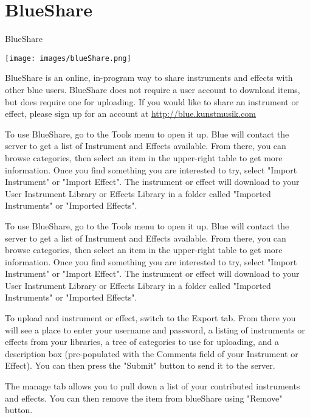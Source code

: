 \section{BlueShare}\label{blueShare}

BlueShare

\texttt{[image: images/blueShare.png]}

BlueShare is an online, in-program way to share instruments and effects
with other blue users. BlueShare does not require a user account to
download items, but does require one for uploading. If you would like to
share an instrument or effect, please sign up for an account at
\url{http://blue.kunstmusik.com}

To use BlueShare, go to the Tools menu to open it up. Blue will contact
the server to get a list of Instrument and Effects available. From
there, you can browse categories, then select an item in the upper-right
table to get more information. Once you find something you are
interested to try, select "Import Instrument" or "Import Effect". The
instrument or effect will download to your User Instrument Library or
Effects Library in a folder called "Imported Instruments" or "Imported
Effects".

To use BlueShare, go to the Tools menu to open it up. Blue will contact
the server to get a list of Instrument and Effects available. From
there, you can browse categories, then select an item in the upper-right
table to get more information. Once you find something you are
interested to try, select "Import Instrument" or "Import Effect". The
instrument or effect will download to your User Instrument Library or
Effects Library in a folder called "Imported Instruments" or "Imported
Effects".

To upload and instrument or effect, switch to the Export tab. From there
you will see a place to enter your username and password, a listing of
instruments or effects from your libraries, a tree of categories to use
for uploading, and a description box (pre-populated with the Comments
field of your Instrument or Effect). You can then press the "Submit"
button to send it to the server.

The manage tab allows you to pull down a list of your contributed
instruments and effects. You can then remove the item from blueShare
using "Remove" button.
